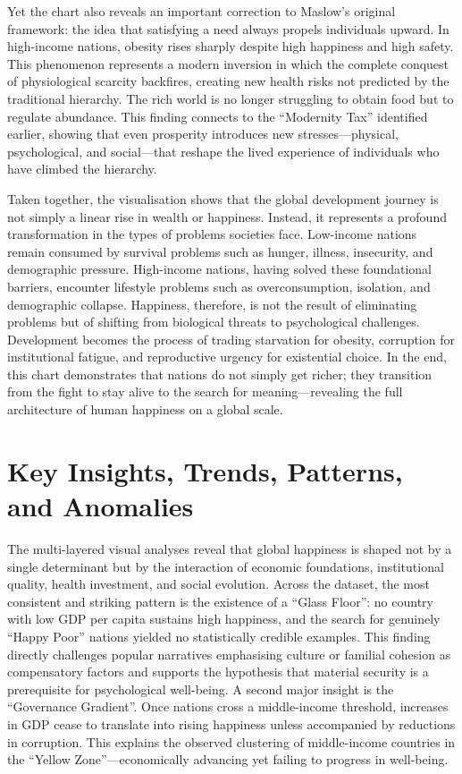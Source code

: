 \documentclass[conference]{IEEEtran}
\begin{document}
Yet the chart also reveals an important correction to Maslow’s original framework: the idea that satisfying a need always propels individuals upward. In high-income nations, obesity rises sharply despite high happiness and high safety. This phenomenon represents a modern inversion in which the complete conquest of physiological scarcity backfires, creating new health risks not predicted by the traditional hierarchy. The rich world is no longer struggling to obtain food but to regulate abundance. This finding connects to the “Modernity Tax” identified earlier, showing that even prosperity introduces new stresses—physical, psychological, and social—that reshape the lived experience of individuals who have climbed the hierarchy.

Taken together, the visualisation shows that the global development journey is not simply a linear rise in wealth or happiness. Instead, it represents a profound transformation in the types of problems societies face. Low-income nations remain consumed by survival problems such as hunger, illness, insecurity, and demographic pressure. High-income nations, having solved these foundational barriers, encounter lifestyle problems such as overconsumption, isolation, and demographic collapse. Happiness, therefore, is not the result of eliminating problems but of shifting from biological threats to psychological challenges. Development becomes the process of trading starvation for obesity, corruption for institutional fatigue, and reproductive urgency for existential choice. In the end, this chart demonstrates that nations do not simply get richer; they transition from the fight to stay alive to the search for meaning—revealing the full architecture of human happiness on a global scale.
\section{Key Insights, Trends, Patterns, and Anomalies}
\noindent
The multi-layered visual analyses reveal that global happiness is shaped not by a single determinant but by the interaction of economic foundations, institutional quality, health investment, and social evolution. Across the dataset, the most consistent and striking pattern is the existence of a “Glass Floor”: no country with low GDP per capita sustains high happiness, and the search for genuinely “Happy Poor” nations yielded no statistically credible examples. This finding directly challenges popular narratives emphasising culture or familial cohesion as compensatory factors and supports the hypothesis that material security is a prerequisite for psychological well-being. A second major insight is the “Governance Gradient”. Once nations cross a middle-income threshold, increases in GDP cease to translate into rising happiness unless accompanied by reductions in corruption. This explains the observed clustering of middle-income countries in the “Yellow Zone”—economically advancing yet failing to progress in well-being.
\end{document}
